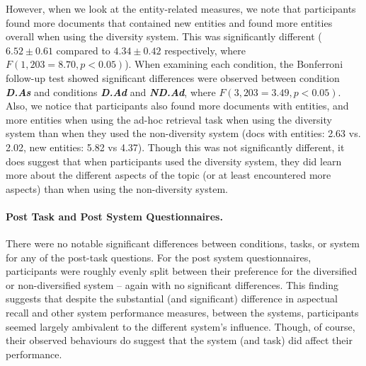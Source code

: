 However, when we look at the entity-related measures, we note that participants found more documents that contained new entities and found more entities overall when using the diversity system. This was significantly different ($6.52\pm0.61$ compared to $4.34\pm0.42$ respectively, where $F(1, 203=8.70, p<0.05)$). When examining each condition, the Bonferroni follow-up test showed significant differences were observed between condition \textbf{\emph{D.As}} and conditions \textbf{\emph{D.Ad}} and \textbf{\emph{ND.Ad}}, where $F(3, 203=3.49, p<0.05)$. Also, we notice that participants also found more documents with entities, and more entities when using the ad-hoc retrieval task when using the diversity system than when they used the non-diversity system (docs with entities: 2.63 vs. 2.02, new entities: 5.82 vs 4.37). Though this was not significantly different, it does suggest that when participants used the diversity system, they did learn more about the different aspects of the topic (or at least encountered more aspects) than when using the non-diversity system. 

\paragraph{Post Task and Post System Questionnaires.} There were no notable significant differences between conditions, tasks, or system for any of the post-task questions. For the post system questionnaires, participants were roughly evenly split between their preference for the diversified or non-diversified system -- again with no significant differences. This finding suggests that despite the substantial (and significant) difference in aspectual recall and other system performance measures, between the systems, participants seemed largely ambivalent to the different system's influence. Though, of course, their observed behaviours do suggest that the system (and task) did affect their performance.

